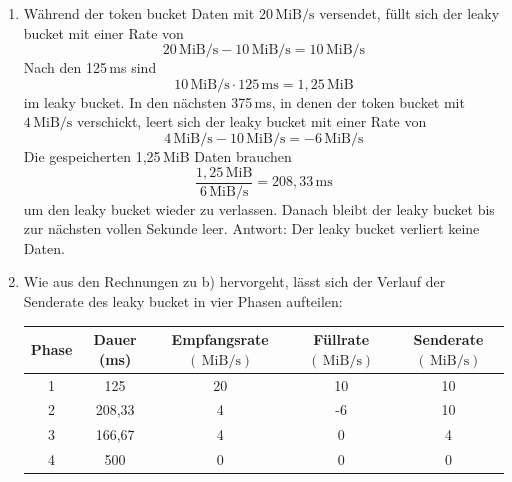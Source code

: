 \documentclass[a4paper,
			llpt,
			solution,
			accentcolor=tud2d,
			colorbacktitle
			]
			{tudexercise}
\newcommand{\MiBs}{\,\mathrm{MiB}/\mathrm{s}}
\begin{document}
\begin{enumerate}
\begin{multicols}{2}
\end{multicols}
\newpage
\item
Während der token bucket Daten mit $20\MiBs$ versendet, füllt sich der leaky bucket mit einer Rate von
$$
20 \MiBs - 10\MiBs = 10\MiBs
$$
Nach den 125\,ms sind
$$
10\MiBs  \cdot 125\mathrm{\,ms} = 1,25 \mathrm{\,MiB}
$$ im leaky bucket.
In den nächsten 375\,ms, in denen der token bucket mit $4\MiBs$ verschickt, leert sich der leaky bucket mit einer Rate von
$$
4\MiBs - 10\MiBs = -6 \MiBs
$$
Die gespeicherten 1,25\,MiB Daten brauchen
$$
\frac{1,25\mathrm{\,MiB}}{6\MiBs} = 208,33\mathrm{\,ms}
$$
um den leaky bucket wieder zu verlassen.
Danach bleibt der leaky bucket bis zur nächsten vollen Sekunde leer.\newline
Antwort: Der leaky bucket verliert keine Daten.
\item
Wie aus den Rechnungen zu b) hervorgeht, lässt sich der Verlauf der Senderate des leaky bucket in vier Phasen aufteilen:
\begin{center}
\begin{tabular}{|c|c|c|c|c|}
\hline
Phase
&
Dauer (ms)
&
Empfangsrate $\left( \MiBs \right)$
&
Füllrate $\left( \MiBs \right)$
&
Senderate $\left( \MiBs \right)$
\\ \hline
1 & 125    & 20 & 10 & 10 \\ \hline
2 & 208,33 &  4 & -6 & 10 \\ \hline
3 & 166,67 &  4 &  0 &  4 \\ \hline
4 & 500    &  0 &  0 &  0 \\ \hline
\end{tabular}
\end{center}
\begin{center}
\end{center}
\end{enumerate}
\end{document}
